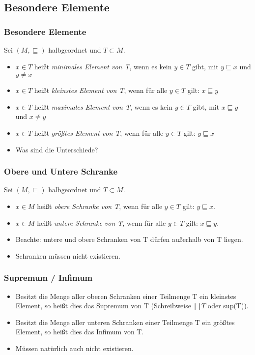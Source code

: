 \documentclass{beamer}
\begin{document}
\subsection{Besondere Elemente}
\begin{frame}
	\frametitle{Besondere Elemente}
	Sei $(M,\sqsubseteq)$ halbgeordnet und $T \subset M$.
	\begin{itemize}
		\item $x \in T$ heißt \textit{minimales Element von T}, wenn es kein $y \in T$ gibt, mit $y \sqsubseteq x$ und $y \neq x$
		\item $x \in T$ heißt \textit{kleinstes Element von T}, wenn für alle $y \in T$ gilt: $x \sqsubseteq y$
		\item $x \in T$ heißt \textit{maximales Element von T}, wenn es kein $y \in T$ gibt, mit $x \sqsubseteq y$ und $x \neq y$
		\item $x \in T$ heißt \textit{größtes Element von T}, wenn für alle $y \in T$ gilt: $y \sqsubseteq x$
		\pause
		\item Was sind die Unterschiede?
	\end{itemize}
\end{frame}


\begin{frame}
	\frametitle{Obere und Untere Schranke}
	Sei $(M,\sqsubseteq)$ halbgeordnet und $T \subset M$.
	\begin{itemize}
		\item $x \in M$ heißt \textit{obere Schranke von T}, wenn für alle $y \in T$ gilt: $y \sqsubseteq x$.
		\item $x \in M$ heißt \textit{untere Schranke von T}, wenn für alle $y \in T$ gilt: $x \sqsubseteq y$.
		\pause
		\item Beachte: untere und obere Schranken von T dürfen außerhalb von T liegen.
		\item Schranken müssen nicht existieren.
	\end{itemize}
\end{frame}

\begin{frame}
	\frametitle{Supremum / Infimum}
	\begin{itemize}
		\item Besitzt die Menge aller oberen Schranken einer Teilmenge T ein kleinstes Element, so heißt dies das Supremum von T (Schreibweise $\bigsqcup T$ oder sup(T)).
		\item Besitzt die Menge aller unteren Schranken einer Teilmenge T ein größtes Element, so heißt dies das Infimum von T.
		\item Müssen natürlich auch nicht existieren.
	\end{itemize}
\end{frame}
\end{document}
